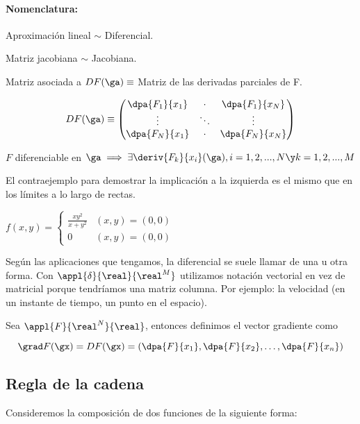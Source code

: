 \paragraph{Nomenclatura: }
Aproximación lineal $\sim$ Diferencial.

Matriz jacobiana $\sim$ Jacobiana.

\begin{defn}
 Matriz asociada a $DF(\ga) \equiv $ Matriz de las derivadas parciales de F.
 
 $$DF(\ga) \equiv \begin{pmatrix}
                \dpa{F_1}{x_1} & \cdot & \dpa{F_1}{x_N}\\
                \vdots& \ddots & \vdots\\
                \dpa{F_N}{x_1} & \cdot & \dpa{F_N}{x_N}
                \end{pmatrix}
$$
\end{defn}

\begin{theorem}
 $F$ diferenciable en $\ga \implies \exists \deriv{F_k}{x_i}(\ga), i=1,2,...,N \y k = 1,2,...,M$
\end{theorem}

El contraejemplo para demostrar la implicación a la izquierda es el mismo que en los límites a lo largo de rectas.

$f(x,y) = \left\{ \begin{matrix}

\frac{xy^2}{x+y^2} & (x,y) = (0,0) \\ 
0 & (x,y)=(0,0)
           
          \end{matrix}\right.
$

Según las aplicaciones que tengamos, la diferencial se suele llamar de una u otra forma. Con $\appl{\delta}{\real}{\real^M}$ utilizamos notación vectorial en vez de matricial porque tendríamos una matriz columna. Por ejemplo: la velocidad (en un instante de tiempo, un punto en el espacio).

\begin{defn}[Gradiente] Sea $\appl{F}{\real^N}{\real}$, entonces definimos el vector gradiente como 

\[ \grad F(\gx) = DF(\gx) = \left(\dpa{F}{x_1}, \dpa{F}{x_2},\dotsc, \dpa{F}{x_n}\right) \]
\end{defn}


\subsection{Regla de la cadena}
Consideremos la composición de dos funciones de la siguiente forma:

